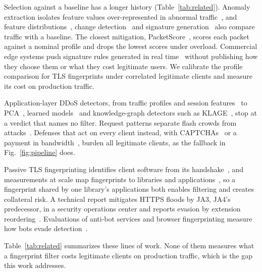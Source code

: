 \documentclass[conference,letterpaper,10pt]{IEEEtran}
\newcommand\1{\textit{(i)}}
\newcommand\2{\textit{(ii)}}
\newcommand\3{\textit{(iii)}}
\newcommand\4{\textit{(iv)}}
\newcommand\5{\textit{(v)}}
\newcommand\6{\textit{(vi)}}
\newcommand\7{\textit{(vii)}}
\newcommand\8{\textit{(viii)}}
\newcommand\9{\textit{(ix)}}
\begin{document}
Selection against a baseline has a longer history (Table~\ref{tab:related}). Anomaly extraction isolates feature values over-represented in abnormal traffic~\cite{silveira2010urca,brauckhoff2009extraction}, and feature distributions~\cite{lakhina2005mining}, change detection~\cite{krishnamurthy2003sketch} and signature generation~\cite{li2006hamsa} also compare traffic with a baseline. The closest mitigation, PacketScore~\cite{kim2006packetscore}, scores each packet against a nominal profile and drops the lowest scores under overload. Commercial edge systems push signature rules generated in real time~\cite{yoachimik2021dosd} without publishing how they choose them or what they cost legitimate users. We calibrate the profile comparison for TLS fingerprints under correlated legitimate clients and measure its cost on production traffic.

Application-layer DDoS detectors, from traffic profiles and session features~\cite{tripathi2021application} to PCA~\cite{fernandes2015autonomous,bharathi2012pca}, learned models~\cite{kemp2023approach} and knowledge-graph detectors such as KLAGE~\cite{belcastro2025klage}, stop at a verdict that names no filter. Request patterns separate flash crowds from attacks~\cite{xie2009monitoring}. Defenses that act on every client instead, with CAPTCHAs~\cite{kandula2005botz} or a payment in bandwidth~\cite{walfish2006speakup}, burden all legitimate clients, as the fallback in Fig.~\ref{fig:pipeline} does.

Passive TLS fingerprinting identifies client software from its handshake~\cite{husak2016https}, and measurements at scale map fingerprints to libraries and applications~\cite{anderson2019tls,kotzias2018coming,razaghpanah2017studying}, so a fingerprint shared by one library's applications both enables filtering and creates collateral risk. A technical report mitigates HTTPS floods by JA3, JA4's predecessor, in a security operations center and reports evasion by extension reordering~\cite{kobayashi2024ja3}. Evaluations of anti-bot services and browser fingerprinting measure how bots evade detection~\cite{aminazad2020webrunner,vastel2020fpcrawlers}.

Table~\ref{tab:related} summarizes these lines of work. None of them measures what a fingerprint filter costs legitimate clients on production traffic, which is the gap this work addresses.
\end{document}
